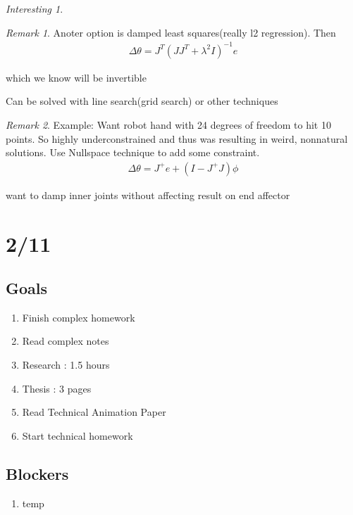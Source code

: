\documentclass[11pt]{article}
\theoremstyle{remark}
\newtheorem{remark}{Remark}
\newtheorem{interest}{Interesting}
\begin{document}
\begin{interest}
\begin{remark}
	Anoter option is damped least squares(really l2 regression). Then
	\begin{align*}
		\Delta \theta = J^T(JJ^T + \lambda^2I)^{-1}e
	\end{align*}

	which we know will be invertible

	Can be solved with line search(grid search) or other techniques
\end{remark}

\begin{remark}
	Example: Want robot hand with 24 degrees of freedom to hit 10 points. So highly underconstrained and thus was resulting in weird, nonnatural solutions. Use Nullspace technique to add some constraint.
	\begin{align*}
		\Delta \theta = J^+e+ (I-J^+J)\phi
	\end{align*}

	want to damp inner joints without affecting result on end affector
\end{remark}

\section{2/11}

\subsection{Goals}

\begin{enumerate}
	\item Finish complex homework
	\item Read complex notes	
	\item Research : 1.5 hours
	\item Thesis : 3 pages
	\item Read Technical Animation Paper
	\item Start technical homework
\end{enumerate}

\subsection{Blockers}

\begin{enumerate}
	\item temp
\end{enumerate}


\end{interest}
\end{document}
